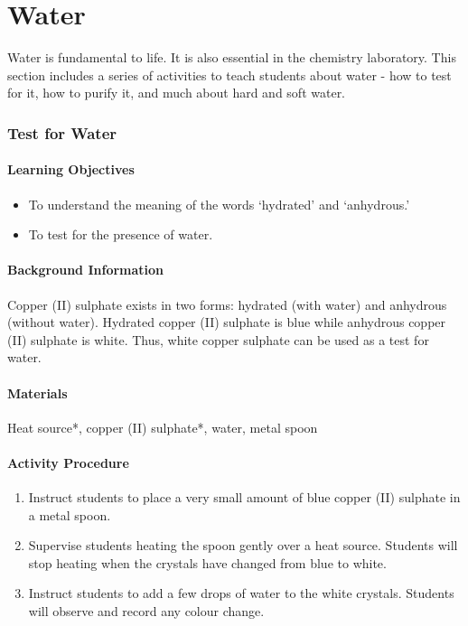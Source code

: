 \chapter{Water}

Water is fundamental to life. It is also essential in the chemistry laboratory. This section includes a series of activities to teach students about water - how to test for it, how to purify it, and much about hard and soft water.

\subsection{Test for Water}

\subsubsection*{Learning Objectives}
\begin{itemize}
\item{To understand the meaning of the words `hydrated' and `anhydrous.'}
\item{To test for the presence of water.}
\end{itemize}

\subsubsection*{Background Information}
Copper (II) sulphate exists in two forms: hydrated (with water) and anhydrous (without water). Hydrated copper (II) sulphate is blue while anhydrous copper (II) sulphate is white. Thus, white copper sulphate can be used as a test for water.

\subsubsection*{Materials}
Heat source*, copper (II) sulphate*, water, metal spoon

\subsubsection*{Activity Procedure}
\begin{enumerate}
\item{Instruct students to place a very small amount of blue copper (II) sulphate in a metal spoon.}
\item{Supervise students heating the spoon gently over a heat source. Students will stop heating when the crystals have changed from blue to white.}
\item{Instruct students to add a few drops of water to the white crystals. Students will observe and record any colour change.}
\end{enumerate}

